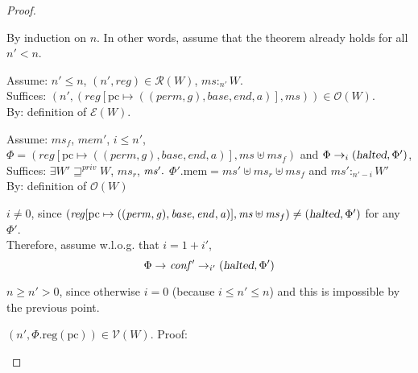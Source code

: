 \documentclass[a4paper]{article}
\newcommand{\update}[2]{[#1 \mapsto #2]}
\newcommand{\var}[1]{\mathit{#1}}
\newcommand{\hs}{\var{ms}}
\newcommand{\ms}{\hs}
\newcommand{\gl}{\var{g}}
\newcommand{\pcreg}{\mathrm{pc}}
\newcommand{\addr}{\var{a}}
\newcommand{\start}{\var{base}}
\newcommand{\addrend}{\var{end}}
\newcommand{\reg}{\var{reg}}
\newcommand{\heap}{\var{mem}}
\newcommand{\perm}{\var{perm}}
\newcommand{\plainproj}[1]{\mathrm{#1}}
\newcommand{\memheap}[1][\Phi]{#1.\plainproj{mem}}
\newcommand{\memreg}[1][\Phi]{#1.\plainproj{reg}}
\newcommand{\halted}{\textsl{halted}}
\newcommand{\plainfun}[2]{
  \ifthenelse{\equal{#2}{}}
  {\mathit{#1}}
  {\mathit{#1}(#2)}
}
\newcommand{\execCond}[1]{\plainfun{executeCondition}{#1}}
\newcommand{\future}{\mathbin{\sqsupseteq}}
\newcommand{\futurewk}{\mathbin{\sqsupseteq}^{\var{pub}}}
\newcommand{\futurestr}{\mathbin{\sqsupseteq}^{\var{priv}}}
\newcommand{\heapSat}[3][\heap]{#1 :_{#2} #3}
\newcommand{\asmType}{\plaindom{AsmType}}
\newcommand{\plaindom}[1]{\mathrm{#1}}
\newcommand{\intr}[2]{\mathcal{#1}}
\newcommand{\valueintr}[1]{\intr{V}{#1}}
\newcommand{\exprintr}[1]{\intr{E}{#1}}
\newcommand{\regintr}[1]{\intr{R}{#1}}
\newcommand{\stdvr}{\valueintr{\asmType}}
\newcommand{\stder}{\exprintr{\asmType}}
\newcommand{\stdrr}{\regintr{\asmType}}
\newcommand{\observations}{\mathcal{O}}
\newcommand{\npair}[2][n]{\left(#1,#2 \right)}
\newcommand{\plainperm}[1]{\textsc{#1}}
\newcommand{\exec}{\plainperm{rx}}
\newcommand{\rwx}{\plainperm{rwx}}
\newcommand{\rwlx}{\plainperm{rwlx}}
\newcommand{\local}{\plainperm{local}}
\newcommand{\glob}{\plainperm{global}}
\newcommand{\step}[1][]{\rightarrow_{#1}}
\begin{document}
\begin{proof}
  \begin{enumproof}
  \item By induction on $n$. In other words, assume that the theorem already
    holds for all $n' < n$.
  \item Assume: $n' \leq n$, $\npair[n']{\reg}\in \stdrr(W)$, $\heapSat[\hs]{n'}{W}$.\\
    Suffices: $\npair[n']{(\reg\update{\pcreg}{((\perm,\gl),\start,\addrend,\addr)},\hs)}\in\observations(W)$.\\
    By: definition of $\stder(W)$.
  \item Assume: $\ms_f$, $\heap'$, $i \leq n'$, $\Phi =
    (\reg\update{\pcreg}{((\perm,\gl),\start,\addrend,\addr)},\hs \uplus \ms_f)$
    and $\Phi \step[i] (\halted,\Phi')$,\\
    Suffices: $\exists W' \futurestr W$, $\hs_r$, $\hs' \ldotp$
    $\memheap[\Phi'] = \hs' \uplus \hs_r \uplus \ms_f$ and $\heapSat[\hs']{n'-i}{W'}$\\
    By: definition of $\observations(W)$ \label{suff-after-eval}
  \item $i \neq 0$, since
    $(\reg\update{\pcreg}{((\perm,\gl),\start,\addrend,\addr)},\hs \uplus
    \ms_f)\neq (\halted,\Phi')$ for any $\Phi'$. \\
    Therefore, assume w.l.o.g. that $i = 1+i'$,
    \begin{equation*}
      \Phi \step \var{conf'} \step[i'] (\halted,\Phi')
    \end{equation*} \label{step:ip-non-zero}
  \item $n \geq n' > 0$, since otherwise $i = 0$ (because $i \leq n'\leq n$) and this is
    impossible by the previous point.
  \item $\npair[n']{\memreg(\pcreg)}\in\stdvr(W)$. \label{step:ftlr-pc-vr}
    Proof:
\end{enumproof}
\end{proof}
\end{document}
